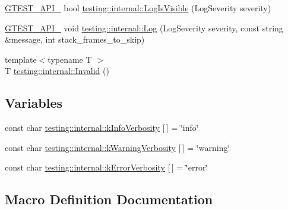 \begin{DoxyCompactItemize}
\item 
\hyperlink{gtest-port_8h_aa73be6f0ba4a7456180a94904ce17790}{G\+T\+E\+S\+T\+\_\+\+A\+P\+I\+\_\+} bool \hyperlink{namespacetesting_1_1internal_a69ffdba5ee36743e88d8f89b79e566ff}{testing\+::internal\+::\+Log\+Is\+Visible} (Log\+Severity severity)
\item 
\hyperlink{gtest-port_8h_aa73be6f0ba4a7456180a94904ce17790}{G\+T\+E\+S\+T\+\_\+\+A\+P\+I\+\_\+} void \hyperlink{namespacetesting_1_1internal_ac0bc151763a8187d74387c4b2ba685c9}{testing\+::internal\+::\+Log} (Log\+Severity severity, const string \&message, int stack\+\_\+frames\+\_\+to\+\_\+skip)
\item 
{\footnotesize template$<$typename T $>$ }\\T \hyperlink{namespacetesting_1_1internal_a3316c24e8a79f5def3e85d763ae50854}{testing\+::internal\+::\+Invalid} ()
\end{DoxyCompactItemize}
\subsection*{Variables}
\begin{DoxyCompactItemize}
\item 
const char \hyperlink{namespacetesting_1_1internal_a96274a788ffc75a6dffdfa8aa1f34fb9}{testing\+::internal\+::k\+Info\+Verbosity} \mbox{[}$\,$\mbox{]} = \char`\"{}info\char`\"{}
\item 
const char \hyperlink{namespacetesting_1_1internal_ad9386ccda6b6deac2f7b84784d3088c0}{testing\+::internal\+::k\+Warning\+Verbosity} \mbox{[}$\,$\mbox{]} = \char`\"{}warning\char`\"{}
\item 
const char \hyperlink{namespacetesting_1_1internal_a3d730761274e7b80dd66e5014171fcb5}{testing\+::internal\+::k\+Error\+Verbosity} \mbox{[}$\,$\mbox{]} = \char`\"{}error\char`\"{}
\end{DoxyCompactItemize}


\subsection{Macro Definition Documentation}
